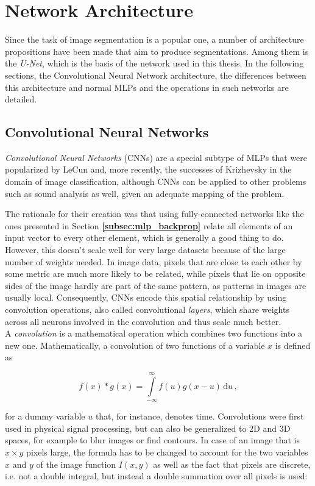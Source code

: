 \chapter {Network Architecture}
\label{chap:network}

Since the task of image segmentation is a popular one, a number of architecture propositions have been made that aim to produce segmentations. Among them is the \textit{U-Net}, which is the basis of the network used in this thesis.  In the following sections, the Convolutional Neural Network architecture, the differences between this architecture and normal MLPs and the operations in such networks are detailed.


	\section{Convolutional Neural Networks}
\label{sec:CNN}
\textit{Convolutional Neural Networks} (CNNs) are a special subtype of MLPs that were popularized by LeCun \cite{lecun98} and, more recently, the successes of Krizhevsky \cite{krizhevsky2012} in the domain of image classification, although CNNs can be applied to other problems such as sound analysis \cite{CNN_sound} as well, given an adequate mapping of the problem. 

The rationale for their creation was that using fully-connected networks like the ones presented in Section \textbf{\ref{subsec:mlp_backprop}} relate all elements of an input vector to every other element, which is generally a good thing to do. However, this doesn't scale well for very large datasets because of the large number of weights needed. In image data, pixels that are close to each other by some metric are much more likely to be related, while pixels that lie on opposite sides of the image hardly are part of the same pattern, as patterns in images are usually local. Consequently, CNNs encode this spatial relationship by using convolution operations, also called convolutional \textit{layers}, which share weights across all neurons involved in the convolution and thus scale much better.\\

\noindent A \textit{convolution} is a mathematical operation which combines two functions into a new one. Mathematically, a convolution of two functions of a variable $x$ is defined as

\[ f(x) * g(x) = \int \limits_{-\infty}^{\infty} f(u)g(x - u) \, \text{d}u \,, \]

for a dummy variable $u$ that, for instance, denotes time. Convolutions were first used in physical signal processing, but can also be generalized to 2D and 3D spaces, for example to blur images or find contours. In case of an image that is $x \times y$ pixels large, the formula has to be changed to account for the two variables $x$ and $y$ of the image function $I(x, y)$ as well as the fact that pixels are discrete, i.e. not a double integral, but instead a double summation over all pixels is used:

